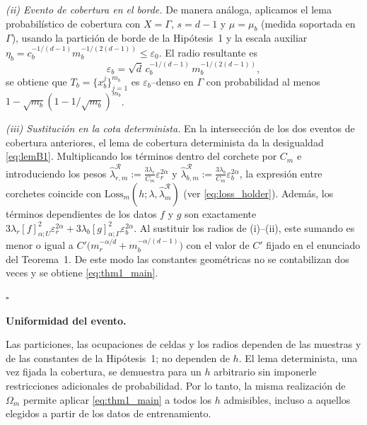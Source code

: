 \smallskip
\noindent\textit{(ii) Evento de cobertura en el borde.}
De manera análoga, aplicamos el lema probabilístico de cobertura con $X=\Gamma$, $s=d-1$ y $\mu=\mu_b$ (medida soportada en $\Gamma$), usando la partición de borde de la Hipótesis~1 y la escala auxiliar
$\eta_b=c_b^{-1/(d-1)}m_b^{-1/(2(d-1))}\leq\varepsilon_0$.
El radio resultante es
\[
\varepsilon_b=\sqrt d\,c_b^{-1/(d-1)}\,m_b^{-1/(2(d-1))},
\]
se obtiene que $T_b=\{x_b^j\}_{j=1}^{m_b}$ es $\varepsilon_b$--denso en $\Gamma$ con probabilidad al menos
$1-\sqrt{m_b}(1-1/\sqrt{m_b})^{m_b}$.

\smallskip
\noindent\textit{(iii) Sustitución en la cota determinista.}
En la intersección de los dos eventos de cobertura anteriores, el lema de cobertura determinista da la desigualdad \eqref{eq:lemB1}.
Multiplicando los términos dentro del corchete por $C_m$ e introduciendo los pesos
$\hat{\lambda}^{\mathcal{R}}_{r,m}:=\frac{3\lambda_r}{C_m}\varepsilon_r^{2\alpha}$ y
$\hat{\lambda}^{\mathcal{R}}_{b,m}:=\frac{3\lambda_b}{C_m}\varepsilon_b^{2\alpha}$, la expresión entre corchetes coincide con
$\text{Loss}_m(h;\lambda,\hat\lambda_m^{\mathcal{R}})$ (ver \eqref{eq:loss_holder}). Además, los términos dependientes de los datos
$f$ y $g$ son exactamente
$3\lambda_r[f]_{\alpha;U}^{2}\varepsilon_r^{2\alpha}
+3\lambda_b[g]_{\alpha;\Gamma}^{2}\varepsilon_b^{2\alpha}$.
Al sustituir los radios de (i)--(ii), este sumando es menor o igual a
$C'\big(m_r^{-\alpha/d}+m_b^{-\alpha/(d-1)}\big)$ con el valor de
$C'$ fijado en el enunciado del Teorema~1. De este modo las constantes
geométricas no se contabilizan dos veces y se obtiene
\eqref{eq:thm1_main}.

\hfill $\square$

\medskip
\noindent\textbf{Uniformidad del evento.}\par
Las particiones, las ocupaciones de celdas y los radios dependen de las
muestras y de las constantes de la Hipótesis~1; no dependen de $h$.
El lema determinista, una vez fijada la cobertura, se demuestra para un
$h$ arbitrario sin imponerle restricciones adicionales de probabilidad.
Por lo tanto, la misma realización de $\Omega_m$ permite aplicar
\eqref{eq:thm1_main} a todos los $h$ admisibles, incluso a aquellos
elegidos a partir de los datos de entrenamiento.

